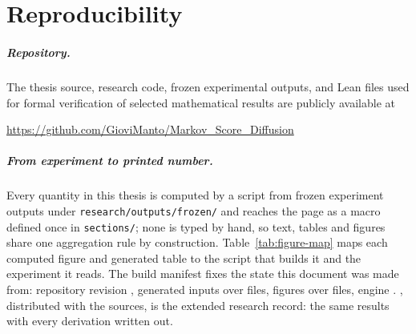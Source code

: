 
\chapter{Reproducibility}\label{app:repro}\label{app:aggregation}\label{app:aggregation-chapter}

\setlength{\emergencystretch}{2em}

\paragraph{Repository.}
The thesis source, research code, frozen experimental outputs, and Lean files
used for formal verification of selected mathematical results are publicly
available at
\begin{center}
  \url{https://github.com/GioviManto/Markov_Score_Diffusion}
\end{center}

\paragraph{From experiment to printed number.}
Every quantity in this thesis is computed by a script from frozen experiment
outputs under \texttt{research/outputs/frozen/} and reaches the page as a
macro defined once in \texttt{sections/}; none is typed by hand, so text,
tables and figures share one aggregation rule by construction.
Table~\ref{tab:figure-map} maps each computed figure and generated table to
the script that builds it and the experiment it reads. The build manifest
fixes the state this document was made from: repository revision
\bmreposha{}, generated inputs \bmgenerated{} over \bmgeneratedcount{} files,
figures \bmfigures{} over \bmfigurecount{} files, engine \bmtectonic{}.
\Compendium{}, distributed with the sources, is the extended research record:
the same results with every derivation written out.

